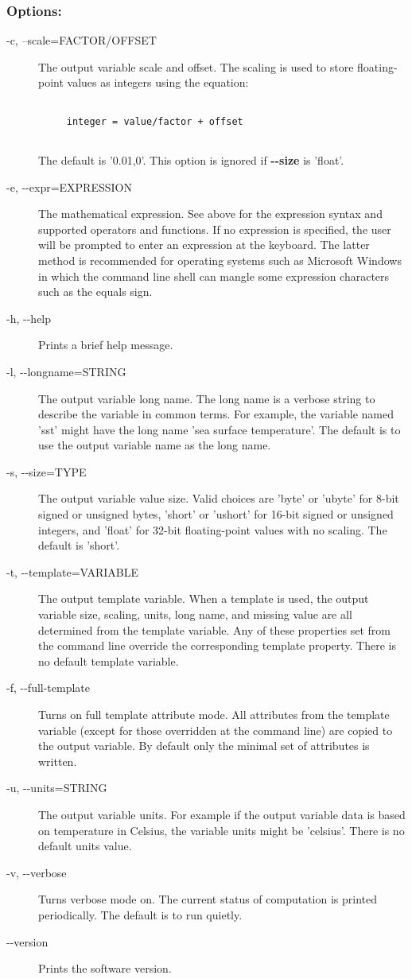 \subsubsection*{Options:}
\begin{description}
\item[ -c, --scale=FACTOR/OFFSET ] The output variable scale and offset. The scaling is used to store floating-point values as integers using the equation: \begin{verbatim}

     integer = value/factor + offset
   
\end{verbatim}
 The default is '0.01,0'. This option is ignored if \textbf{-{-}size}
 is 'float'. 
\item[ -e, -{-}expr=EXPRESSION ] The mathematical expression. See above for the expression syntax and supported operators and functions. If no expression is specified, the user will be prompted to enter an expression at the keyboard. The latter method is recommended for operating systems such as Microsoft Windows in which the command line shell can mangle some expression characters such as the equals sign. 
\item[ -h, -{-}help ] Prints a brief help message. 
\item[ -l, -{-}longname=STRING ] The output variable long name. The long name is a verbose string to describe the variable in common terms. For example, the variable named 'sst' might have the long name 'sea surface temperature'. The default is to use the output variable name as the long name. 
\item[ -s, -{-}size=TYPE ] The output variable value size. Valid choices are 'byte' or 'ubyte' for 8-bit signed or unsigned bytes, 'short' or 'ushort' for 16-bit signed or unsigned integers, and 'float' for 32-bit floating-point values with no scaling. The default is 'short'. 
\item[ -t, -{-}template=VARIABLE ] The output template variable. When a template is used, the output variable size, scaling, units, long name, and missing value are all determined from the template variable. Any of these properties set from the command line override the corresponding template property. There is no default template variable. 
\item[ -f, -{-}full-template ] Turns on full template attribute mode. All attributes from the template variable (except for those overridden at the command line) are copied to the output variable. By default only the minimal set of attributes is written. 
\item[ -u, -{-}units=STRING ] The output variable units. For example if the output variable data is based on temperature in Celsius, the variable units might be 'celsius'. There is no default units value. 
\item[ -v, -{-}verbose ] Turns verbose mode on. The current status of computation is printed periodically. The default is to run quietly. 
\item[-{-}version]Prints the software version.

\end{description}
